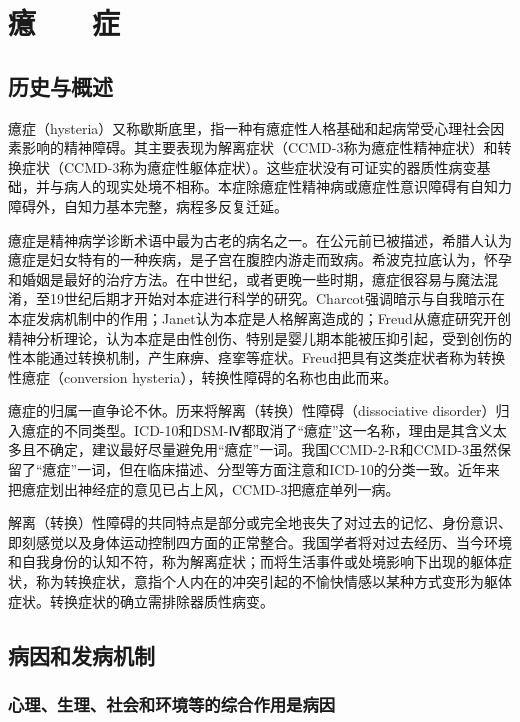 \section{癔　　症}

\subsection{历史与概述}

癔症（hysteria）又称歇斯底里，指一种有癔症性人格基础和起病常受心理社会因素影响的精神障碍。其主要表现为解离症状（CCMD-3称为癔症性精神症状）和转换症状（CCMD-3称为癔症性躯体症状）。这些症状没有可证实的器质性病变基础，并与病人的现实处境不相称。本症除癔症性精神病或癔症性意识障碍有自知力障碍外，自知力基本完整，病程多反复迁延。

癔症是精神病学诊断术语中最为古老的病名之一。在公元前已被描述，希腊人认为癔症是妇女特有的一种疾病，是子宫在腹腔内游走而致病。希波克拉底认为，怀孕和婚姻是最好的治疗方法。在中世纪，或者更晚一些时期，癔症很容易与魔法混淆，至19世纪后期才开始对本症进行科学的研究。Charcot强调暗示与自我暗示在本症发病机制中的作用；Janet认为本症是人格解离造成的；Freud从癔症研究开创精神分析理论，认为本症是由性创伤、特别是婴儿期本能被压抑引起，受到创伤的性本能通过转换机制，产生麻痹、痉挛等症状。Freud把具有这类症状者称为转换性癔症（conversion
hysteria），转换性障碍的名称也由此而来。

癔症的归属一直争论不休。历来将解离（转换）性障碍（dissociative
disorder）归入癔症的不同类型。ICD-10和DSM-Ⅳ都取消了“癔症”这一名称，理由是其含义太多且不确定，建议最好尽量避免用“癔症”一词。我国CCMD-2-R和CCMD-3虽然保留了“癔症”一词，但在临床描述、分型等方面注意和ICD-10的分类一致。近年来把癔症划出神经症的意见已占上风，CCMD-3把癔症单列一病。

解离（转换）性障碍的共同特点是部分或完全地丧失了对过去的记忆、身份意识、即刻感觉以及身体运动控制四方面的正常整合。我国学者将对过去经历、当今环境和自我身份的认知不符，称为解离症状；而将生活事件或处境影响下出现的躯体症状，称为转换症状，意指个人内在的冲突引起的不愉快情感以某种方式变形为躯体症状。转换症状的确立需排除器质性病变。

\subsection{病因和发病机制}

\subsubsection{心理、生理、社会和环境等的综合作用是病因}

